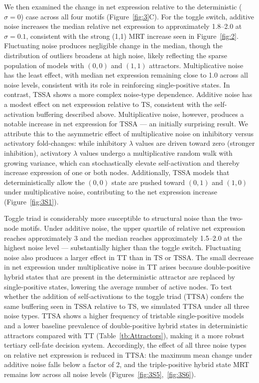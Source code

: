 \documentclass[11pt]{article}
\begin{document}
We then examined the change in net expression relative to the deterministic ($\sigma = 0$) case across all four motifs (Figure~\ref{fig:3}C). For the toggle switch, additive noise increases the median relative net expression to approximately 1.8--2.0 at $\sigma = 0.1$, consistent with the strong (1,1) MRT increase seen in Figure~\ref{fig:2}. Fluctuating noise produces negligible change in the median, though the distribution of outliers broadens at high noise, likely reflecting the sparse population of models with $(0,0)$ and $(1,1)$ attractors. Multiplicative noise has the least effect, with median net expression remaining close to 1.0 across all noise levels, consistent with its role in reinforcing single-positive states. In contrast, TSSA shows a more complex noise-type dependence. Additive noise has a modest effect on net expression relative to TS, consistent with the self-activation buffering described above. Multiplicative noise, however, produces a notable increase in net expression for TSSA --- an initially surprising result. We attribute this to the asymmetric effect of multiplicative noise on inhibitory versus activatory fold-changes: while inhibitory $\lambda$ values are driven toward zero (stronger inhibition), activatory $\lambda$ values undergo a multiplicative random walk with growing variance, which can stochastically elevate self-activation and thereby increase expression of one or both nodes. Additionally, TSSA models that deterministically allow the $(0,0)$ state are pushed toward $(0,1)$ and $(1,0)$ under multiplicative noise, contributing to the net expression increase (Figure~\ref{fig:3S1}).

Toggle triad is considerably more susceptible to structural noise than the two-node motifs. Under additive noise, the upper quartile of relative net expression reaches approximately 3 and the median reaches approximately 1.5--2.0 at the highest noise level --- substantially higher than the toggle switch. Fluctuating noise also produces a larger effect in TT than in TS or TSSA. The small decrease in net expression under multiplicative noise in TT arises because double-positive hybrid states that are present in the deterministic attractor are replaced by single-positive states, lowering the average number of active nodes. To test whether the addition of self-activations to the toggle triad (TTSA) confers the same buffering seen in TSSA relative to TS, we simulated TTSA under all three noise types. TTSA shows a higher frequency of tristable single-positive models and a lower baseline prevalence of double-positive hybrid states in deterministic attractors compared with TT (Table~\ref{tb:Attractors}), making it a more robust tertiary cell-fate decision system. Accordingly, the effect of all three noise types on relative net expression is reduced in TTSA: the maximum mean change under additive noise falls below a factor of 2, and the triple-positive hybrid state MRT remains low across all noise levels (Figures~\ref{fig:3S5},~\ref{fig:3S6}).
\end{document}
